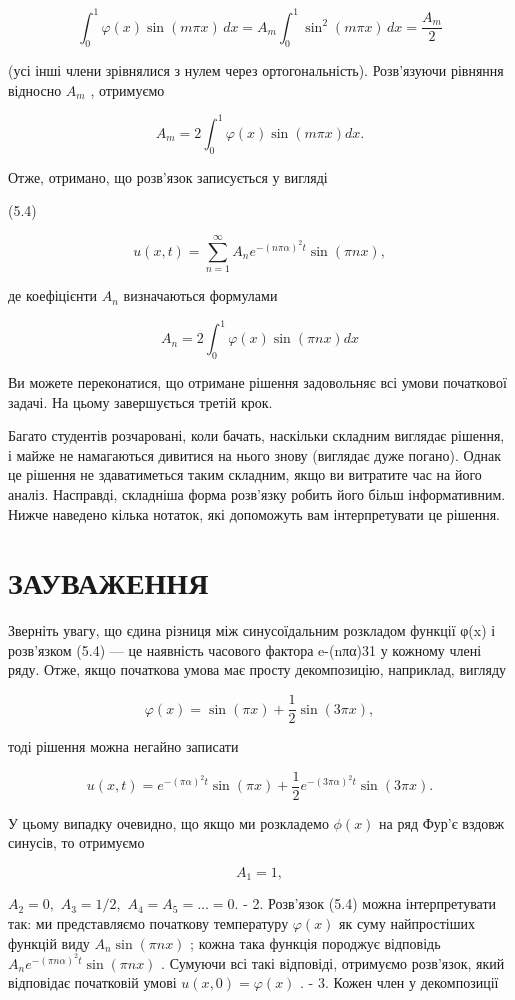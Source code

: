\documentclass[
  ukrainian,
]{article}
\begin{document}
\[
\int_{0}^{1} \varphi(x) \sin(m\pi x) \, dx = A_{m} \int_{0}^{1} \sin^{2}(m\pi x) \, dx = \frac{A_{m}}{2}
\]

(усі інші члени зрівнялися з нулем через ортогональність). Розв'язуючи
рівняння відносно \(A_m\) , отримуємо

\[
A_m = 2 \int_0^1 \varphi(x) \sin(m\pi x) dx.
\]

Отже, отримано, що розв'язок записується у вигляді

(5.4)

\[
u(x, t) = \sum_{n=1}^{\infty} A_n e^{-(n\pi\alpha)^2 t} \sin(\pi n x),
\]

де коефіцієнти \(A_n\) визначаються формулами

\[
A_n = 2\int_0^1 \varphi(x) \sin(\pi nx) dx
\]

Ви можете переконатися, що отримане рішення задовольняє всі умови
початкової задачі. На цьому завершується третій крок.

Багато студентів розчаровані, коли бачать, наскільки складним виглядає
рішення, і майже не намагаються дивитися на нього знову (виглядає дуже
погано). Однак це рішення не здаватиметься таким складним, якщо ви
витратите час на його аналіз. Насправді, складніша форма розв'язку
робить його більш інформативним. Нижче наведено кілька нотаток, які
допоможуть вам інтерпретувати це рішення.

\section{ЗАУВАЖЕННЯ}\label{ux437ux430ux443ux432ux430ux436ux435ux43dux43dux44f-4}

Зверніть увагу, що єдина різниця між синусоїдальним розкладом функції
φ(x) і розв'язком (5.4) --- це наявність часового фактора e-(nπα)31 у
кожному члені ряду. Отже, якщо початкова умова має просту декомпозицію,
наприклад, вигляду

\[
\varphi(x) = \sin(\pi x) + \frac{1}{2}\sin(3\pi x),
\]

тоді рішення можна негайно записати

\[
u(x, t) = e^{-(\pi\alpha)^2 t} \sin(\pi x) + \frac{1}{2} e^{-(3\pi\alpha)^2 t} \sin(3\pi x).
\]

У цьому випадку очевидно, що якщо ми розкладемо \(\phi(x)\) на ряд Фур'є
вздовж синусів, то отримуємо

\[
A_1 = 1,
\]

\(A_2 = 0,\) \(A_3 = 1/2,\) \(A_4 = A_5 = \dots = 0.\) - 2. Розв'язок
(5.4) можна інтерпретувати так: ми представляємо початкову температуру
\(\varphi(x)\) як суму найпростіших функцій виду \(A_n \sin(\pi nx)\) ;
кожна така функція породжує відповідь
\(A_n e^{-(\pi n\alpha)^2 t} \sin(\pi nx)\) . Сумуючи всі такі
відповіді, отримуємо розв'язок, який відповідає початковій умові
\(u(x, 0) = \varphi(x)\) . - 3. Кожен член у декомпозиції
\end{document}
